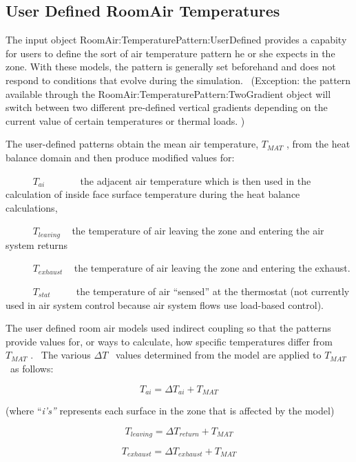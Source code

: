 \subsection{User Defined RoomAir Temperatures}\label{user-defined-roomair-temperatures}

The input object RoomAir:TemperaturePattern:UserDefined provides a capabity for users to define the sort of air temperature pattern he or she expects in the zone. With these models, the pattern is generally set beforehand and does not respond to conditions that evolve during the simulation.~ (Exception: the pattern available through the RoomAir:TemperaturePattern:TwoGradient object will switch between two different pre-defined vertical gradients depending on the current value of certain temperatures or thermal loads. )

The user-defined patterns obtain the mean air temperature, \({T_{MAT}}\) , from the heat balance domain and then produce modified values for:

~~~~~ \({T_{ai}}\) ~~~~~~ the adjacent air temperature which is then used in the calculation of inside face surface temperature during the heat balance calculations,

~~~~~ \({T_{leaving}}\) ~ the temperature of air leaving the zone and entering the air system returns

~~~~~ \({T_{exhaust}}\) ~ the temperature of air leaving the zone and entering the exhaust.

~~~~~ \({T_{stat}}\) ~~~~ the temperature of air ``sensed'' at the thermostat (not currently used in air system control because air system flows use load-based control).

The user defined room air models used indirect coupling so that the patterns provide values for, or ways to calculate, how specific temperatures differ from \({T_{MAT}}\) .~ The various \(\Delta T\) ~values determined from the model are applied to \({T_{MAT}}\) ~as follows:

\begin{equation}
{T_{ai}} = \Delta {T_{ai}} + {T_{MAT}}
\end{equation}

(where ``\emph{i's''} represents each surface in the zone that is affected by the model)

\begin{equation}
{T_{leaving}} = \Delta {T_{return}} + {T_{MAT}}
\end{equation}

\begin{equation}
{T_{exhaust}} = \Delta {T_{exhaust}} + {T_{MAT}}
\end{equation}

